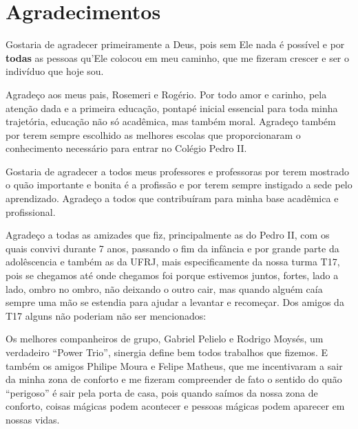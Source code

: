 \chapter*{Agradecimentos}
Gostaria de agradecer primeiramente a Deus, pois sem Ele nada é
possível e por \textbf{todas} as pessoas qu'Ele colocou em meu
caminho, que me fizeram crescer e ser o indivíduo que hoje sou.

Agradeço aos meus pais, Rosemeri e Rogério. Por todo amor e carinho, pela
atenção dada e a primeira educação, pontapé inicial essencial para toda minha
trajetória, educação não só acadêmica, mas também moral. Agradeço também por
terem sempre escolhido as melhores escolas que proporcionaram o conhecimento
necessário para entrar no Colégio Pedro II. 

Gostaria de agradecer a todos meus professores e professoras por terem mostrado o quão importante e bonita é a
   profissão e por terem sempre instigado a sede pelo aprendizado.
   Agradeço a todos que contribuíram para minha base acadêmica e profissional.

Agradeço a todas as amizades que fiz, principalmente as do Pedro II, com os
   quais convivi durante 7 anos, passando o fim da infância e por grande parte
   da adolêscencia e também as da UFRJ, mais especificamente da nossa turma T17,
   pois se chegamos até onde chegamos foi porque estivemos juntos, fortes, lado a lado,
   ombro no ombro, não deixando o outro cair, mas quando alguém caía sempre uma
   mão se estendia para ajudar a levantar e recomeçar.
Dos amigos da T17 alguns não poderiam não ser mencionados:

Os melhores companheiros de grupo, Gabriel Pelielo e Rodrigo Moysés, um
verdadeiro ``Power Trio'', sinergia define bem todos trabalhos que fizemos. E também os amigos Philipe Moura e
Felipe Matheus, que me incentivaram a sair da minha zona de conforto e me
fizeram compreender de fato o sentido do quão ``perigoso'' é sair pela porta de casa, pois
quando saímos da nossa zona de conforto, coisas mágicas podem acontecer e
pessoas mágicas podem aparecer em nossas vidas.

